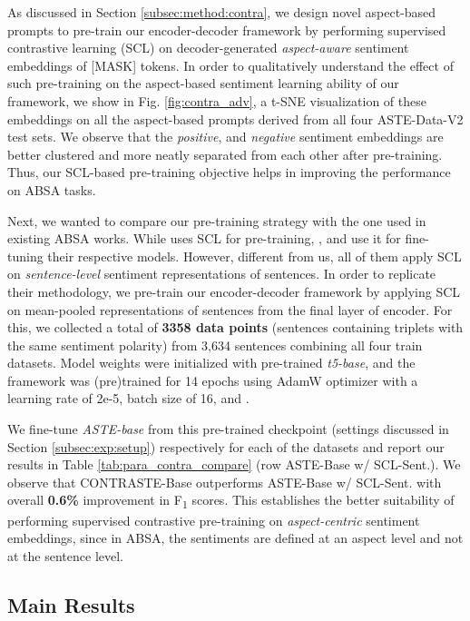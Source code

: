 As discussed in Section \ref{subsec:method:contra}, we design novel aspect-based prompts to pre-train our encoder-decoder framework by performing supervised contrastive learning (SCL) on decoder-generated \textit{aspect-aware} sentiment embeddings of [MASK] tokens. 
In order to qualitatively understand the effect of such pre-training on the aspect-based sentiment learning ability of our framework, we show in Fig. \ref{fig:contra_adv}, a t-SNE \cite{tsne} visualization of these embeddings on all the aspect-based prompts derived from all four ASTE-Data-V2 test sets. 
We observe that the \textit{positive}, and 
\textit{negative} sentiment embeddings are better clustered and more neatly separated from each other after pre-training. 
Thus, our SCL-based pre-training objective helps in improving the performance on ABSA tasks.

Next, we wanted to compare our pre-training strategy with the one used in existing ABSA works. While \citet{li-etal-2021-learning-implicit} uses SCL for pre-training, \citet{contra-cikm21}, and \citet{ke-etal-2021-classic} use it for fine-tuning their respective models. 
However, different from us, all of them apply SCL on \textit{sentence-level} sentiment representations of sentences. 
In order to replicate their methodology, we pre-train our encoder-decoder framework by applying SCL on mean-pooled representations of sentences from the final layer of encoder.
For this, we collected a total of \textbf{3358 data points} (sentences containing triplets with the same sentiment polarity) from 3,634 sentences combining all four train datasets.
Model weights were initialized with pre-trained \textit{t5-base}, and the framework was (pre)trained for 14 epochs using AdamW optimizer with a learning rate of 2e-5, batch size of 16, and .

We fine-tune \textit{ASTE-base} from this pre-trained checkpoint (settings discussed in Section \ref{subsec:exp:setup}) respectively for each of the datasets and report our results in Table \ref{tab:para_contra_compare} (row ASTE-Base w/ SCL-Sent.). 
We observe that CONTRASTE-Base outperforms ASTE-Base w/ SCL-Sent. with overall \textbf{0.6\%} improvement in F\textsubscript{1} scores.
This establishes the better suitability of performing supervised contrastive pre-training on \textit{aspect-centric} sentiment embeddings, since in ABSA, the sentiments are defined at an aspect level and not at the sentence level.



\subsection{Main Results}
\label{subsec:exp:mainres}

